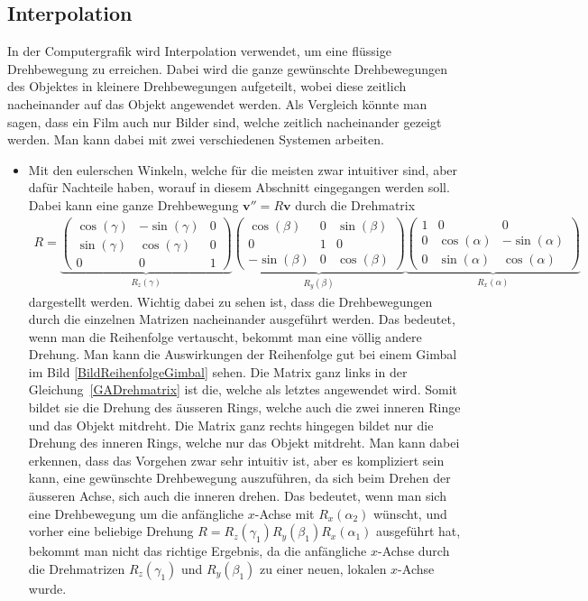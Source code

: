 \subsection{Interpolation}
%
In der Computergrafik wird Interpolation verwendet, um eine flüssige Drehbewegung zu erreichen.
Dabei wird die ganze gewünschte Drehbewegungen des Objektes in kleinere Drehbewegungen aufgeteilt, wobei diese zeitlich nacheinander auf das Objekt angewendet werden.
Als Vergleich könnte man sagen, dass ein Film auch nur Bilder sind, welche zeitlich nacheinander gezeigt werden.
Man kann dabei mit zwei verschiedenen Systemen arbeiten.
\begin{itemize}
	\item Mit den eulerschen Winkeln, welche für die meisten zwar intuitiver sind, aber dafür Nachteile haben, worauf
in diesem Abschnitt eingegangen werden soll.
Dabei kann eine ganze Drehbewegung $\mathbf{v}'' = R\mathbf{v}$ durch die Drehmatrix
	\begin{align} \label{GADrehmatrix}
	R = 
	\underbrace{
		\begin{pmatrix} 
		\cos(\gamma) & -\sin(\gamma) & 0\\ \sin(\gamma) & \cos(\gamma) & 0 \\ 0 & 0 & 1 
		\end{pmatrix}
	}_{\displaystyle{R_z(\gamma)}}
	\underbrace{
		\begin{pmatrix}
		\cos(\beta) &  0 & \sin(\beta)\\ 0 & 1 & 0 \\ -\sin(\beta) & 0 & \cos(\beta)
		\end{pmatrix}
	}_{\displaystyle{R_y(\beta)}}
	\underbrace{
		\begin{pmatrix} 
		1 & 0 & 0 \\ 0 & \cos(\alpha) & -\sin(\alpha)\\ 0 & \sin(\alpha) & \cos(\alpha)
		\end{pmatrix}
	}_{\displaystyle{R_x(\alpha)}}
	\end{align}
	dargestellt werden.
Wichtig dabei zu sehen ist, dass die Drehbewegungen durch die einzelnen Matrizen nacheinander ausgeführt werden.
Das bedeutet, wenn man die Reihenfolge vertauscht, bekommt man eine völlig andere Drehung.
Man kann die Auswirkungen der Reihenfolge gut bei einem Gimbal im Bild \ref{BildReihenfolgeGimbal} sehen.
Die Matrix ganz links in der Gleichung~\eqref{GADrehmatrix} ist die, welche als letztes angewendet wird.
Somit bildet sie die Drehung des äusseren Rings, welche auch die zwei inneren Ringe und das Objekt mitdreht.
Die Matrix ganz rechts hingegen bildet nur die Drehung des inneren Rings, welche nur das Objekt mitdreht.
Man kann dabei erkennen, dass das Vorgehen zwar sehr intuitiv ist, aber es kompliziert sein kann, eine gewünschte Drehbewegung auszuführen, da sich beim Drehen der äusseren Achse, sich auch die inneren drehen.
Das bedeutet, wenn man sich eine Drehbewegung um die anfängliche $x$-Achse mit $R_x(\alpha_2)$ wünscht, und vorher eine beliebige Drehung $R = R_z(\gamma_1) R_y(\beta_1) R_x(\alpha_1)$ ausgeführt hat, bekommt man nicht das richtige Ergebnis, da die anfängliche $x$-Achse durch die Drehmatrizen $R_z(\gamma_1)$ und $R_y(\beta_1)$ zu einer neuen, lokalen $x$-Achse wurde.


\end{itemize}

